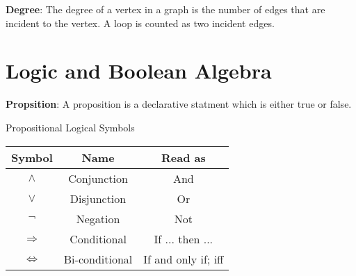 \begin{defn}\label{mod1:defn:Degree}
   \textbf{Degree}: The degree of a vertex  in a graph is the number of edges that are incident to the vertex. A loop is counted as two incident edges.
\end{defn}


\section{Logic and Boolean Algebra}

\begin{defn}\label{mod1:defn:Proposition}
   \textbf{Propsition}: A proposition is a declarative statment which is either true or false.
\end{defn}

\begin{defn}\label{mod1:defn:LogicSymbols}
   Propositional Logical Symbols
      
   \begin{table}[ht]
      \centering
      \begin{tabular}{|c|c|c|}
         \hline
            Symbol & Name & Read as\\
         \hline
         $\land$ & Conjunction & And \\
         $\lor$ &   Disjunction & Or \\
         $\lnot$ & Negation & Not\\
         $\Rightarrow$ & Conditional & If ... then ...\\
         $\Leftrightarrow$ & Bi-conditional & If and only if; iff\\
         \hline
      \end{tabular}
      \label{mod1:tab:LogicSymbols}
   \end{table}

\end{defn}      

